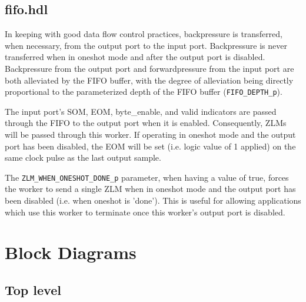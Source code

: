 \documentclass{article}
\def\comp{fifo}
\def\Comp{FIFO}
\begin{document}
\subsection*{\comp.hdl}
\begin{flushleft}
  In keeping with good data flow control practices, backpressure is transferred, when necessary, from the output port to the input port. Backpressure is never transferred when in oneshot mode and after the output port is disabled. Backpressure from the output port and forwardpressure from the input port are both alleviated by the FIFO buffer, with the degree of alleviation being directly proportional to the parameterized depth of the FIFO buffer (\verb+FIFO_DEPTH_p+).\medskip
  
  The input port's SOM, EOM, byte\_enable, and valid indicators are passed through the FIFO to the output port when it is enabled. Consequently, ZLMs will be passed through this worker. If operating in oneshot mode and the output port has been disabled, the EOM will be set (i.e. logic value of 1 applied) on the same clock pulse as the last output sample.\medskip
  
  The \verb+ZLM_WHEN_ONESHOT_DONE_p+ parameter, when having a value of true, forces the worker to send a single ZLM when in oneshot mode and the output port has been disabled (i.e. when oneshot is 'done'). This is useful for allowing applications which use this worker to terminate once this worker's output port is disabled.
\end{flushleft}

\section*{Block Diagrams}
\subsection*{Top level}
\begin{center}
\end{center}
\end{document}

